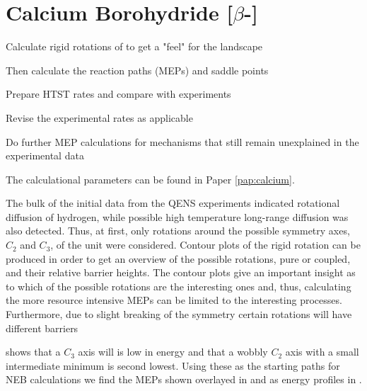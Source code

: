 \section{Calcium Borohydride [$\beta$-]}
\label{sec:borohydrides-calcium}

\bit
\item Calculate rigid rotations of  to get a "feel" for the landscape
\item Then calculate the reaction paths (MEPs) and saddle points
\item Prepare HTST rates and compare with experiments
\item Revise the experimental rates as applicable
\item Do further MEP calculations for mechanisms that still remain unexplained in the experimental data
\eit

The calculational parameters can be found in Paper \ref{pap:calcium}.

The bulk of the initial data from the QENS experiments indicated rotational diffusion of hydrogen, while possible high temperature long-range diffusion was also detected.
Thus, at first, only rotations around the possible symmetry axes, $C_2$ and $C_3$, of the  unit were considered.
Contour plots of the rigid rotation can be produced in order to get an overview of the possible rotations, pure or coupled, and their relative barrier heights.
The contour plots give an important insight as to which of the possible rotations are the interesting ones and, thus, calculating the more resource intensive MEPs can be limited to the interesting processes.
Furthermore, due to slight breaking of the symmetry certain rotations will have different barriers \expand

 shows that a $C_3$ axis will is low in energy and that a wobbly $C_2$ axis with a small intermediate minimum is second lowest.
Using these as the starting paths for NEB calculations we find the MEPs shown overlayed in  and as energy profiles in .


\incomplete

